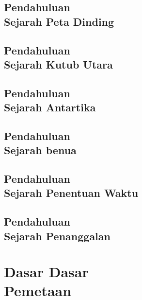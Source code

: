 \documentclass{WileySix}
\begin{document}
\chapter[Sejarah Peta Dinding]
{Pendahuluan\\ Sejarah Peta Dinding}


%

\chapter[Sejarah Kutub Utara]
{Pendahuluan\\ Sejarah Kutub Utara}


\chapter[Tentang Kutub Selatan]
{Pendahuluan\\ Sejarah Antartika}


\chapter[Sejarah Benua]
{Pendahuluan\\ Sejarah benua}


\chapter[Sejarah Penentuan Waktu]
{Pendahuluan\\ Sejarah Penentuan Waktu}


\chapter[Sejarah Penanggalan]
{Pendahuluan\\ Sejarah  Penanggalan}


\part[Dasar Pemetaan]
{Dasar Dasar\\ Pemetaan}
\end{document}
